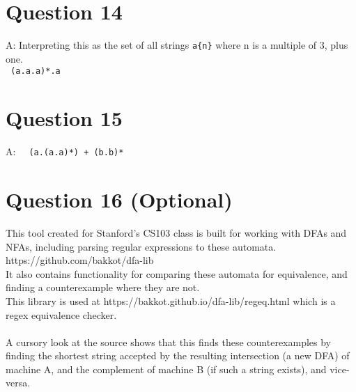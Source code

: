 \documentclass[english]{scrartcl}
\begin{document}
\section*{Question 14}
A: Interpreting this as the set of all strings \verb~a{n}~ where n is a multiple of 3, plus one.\\
\verb~ (a.a.a)*.a ~

\section*{Question 15}
A: \verb~  (a.(a.a)*) + (b.b)*  ~

\section*{Question 16 (Optional)}
This tool created for Stanford's CS103 class is built for working with DFAs and NFAs, including parsing regular expressions to these automata. \\
https://github.com/bakkot/dfa-lib \\
It also contains functionality for comparing these automata for equivalence, and finding a counterexample where they are not. \\
This library is used at https://bakkot.github.io/dfa-lib/regeq.html which is a regex equivalence checker. \\
\\
A cursory look at the source shows that this finds these counterexamples by finding the shortest string accepted by the resulting intersection (a new DFA) of machine A, and the complement of machine B (if such a string exists), and vice-versa.
\end{document}
